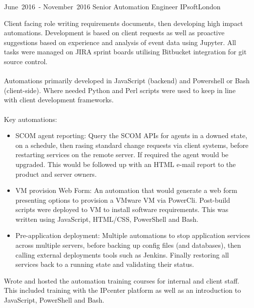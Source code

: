 \cventry %
  {\mbox{June 2016 -} \mbox{November 2016}}
  {Senior Automation Engineer}
  {IPsoft}{London}{}
  {
    Client facing role writing requirements documents, then developing high impact automations. 
    Development is based on client requests as well as proactive suggestions based on experience 
    and analysis of event data using Jupyter.  All tasks were managed on JIRA sprint boards utilising 
    Bitbucket integration for git source control.\\~\\
    Automations primarily developed in JavaScript (backend) and Powershell or Bash (client-side). 
    Where needed Python and Perl scripts were used to keep in line with client development frameworks.\\~\\
    Key automations:\\
    \begin{itemize}
      \item SCOM agent reporting: Query the SCOM APIs for agents in a downed state, on a schedule, 
            then rasing standard change requests via client systems, before restarting services on 
            the remote server. If required the agent would be upgraded. This would be followed up 
            with an HTML e-mail report to the product and server owners.\\ 
      \item VM provision Web Form: An automation that would generate a web form presenting options 
            to provision a VMware VM via PowerCli. Post-build scripts were deployed to VM to install 
            software requirements. This was written using JavaScript, HTML/CSS, PowerShell and Bash.\\
      \item Pre-application deployment: Multiple automations to stop application services across 
            multiple servers, before backing up config files (and databases), then calling external 
            deployments tools such as Jenkins. Finally restoring all services back to a running 
            state and validating their status.\\
    \end{itemize}
    Wrote and hosted the automation training courses for internal and client staff. This included 
    training with the IPcenter platform as well as an introduction to JavaScript, PowerShell and Bash.\\
  }

